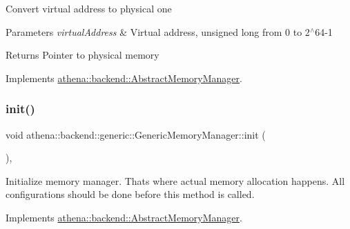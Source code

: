 Convert virtual address to physical one 
\begin{DoxyParams}{Parameters}
{\em virtual\+Address} & Virtual address, unsigned long from 0 to 2$^\wedge$64-\/1 \\
\hline
\end{DoxyParams}
\begin{DoxyReturn}{Returns}
Pointer to physical memory 
\end{DoxyReturn}


Implements \mbox{\hyperlink{classathena_1_1backend_1_1_abstract_memory_manager_ad441d7a2281f5f2b2627272d136f72b8}{athena\+::backend\+::\+Abstract\+Memory\+Manager}}.

\mbox{\label{classathena_1_1backend_1_1generic_1_1_generic_memory_manager_a0e39c872b8b41d5239884322988d314d}} 
\subsubsection{\texorpdfstring{init()}{init()}}
{\footnotesize\ttfamily void athena\+::backend\+::generic\+::\+Generic\+Memory\+Manager\+::init (\begin{DoxyParamCaption}{ }\end{DoxyParamCaption})\hspace{0.3cm}{\ttfamily [override]}, {\ttfamily [virtual]}}

Initialize memory manager. That\textquotesingle{}s where actual memory allocation happens. All configurations should be done before this method is called. 

Implements \mbox{\hyperlink{classathena_1_1backend_1_1_abstract_memory_manager}{athena\+::backend\+::\+Abstract\+Memory\+Manager}}.

\mbox{\label{classathena_1_1backend_1_1generic_1_1_generic_memory_manager_aa7fce5a6cbd9c4f5ad1868735e4546a8}} 
